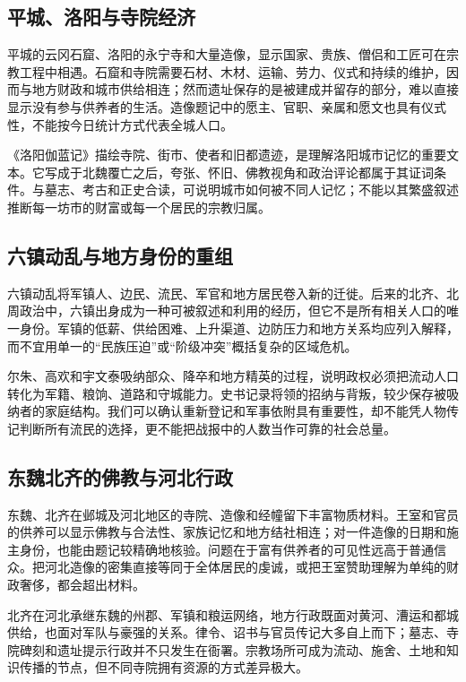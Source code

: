 \subsection{平城、洛阳与寺院经济}

平城的云冈石窟、洛阳的永宁寺和大量造像，显示国家、贵族、僧侣和工匠可在宗教工程中相遇。石窟和寺院需要石材、木材、运输、劳力、仪式和持续的维护，因而与地方财政和城市供给相连；然而遗址保存的是被建成并留存的部分，难以直接显示没有参与供养者的生活。造像题记中的愿主、官职、亲属和愿文也具有仪式性，不能按今日统计方式代表全城人口。

《洛阳伽蓝记》描绘寺院、街市、使者和旧都遗迹，是理解洛阳城市记忆的重要文本。它写成于北魏覆亡之后，夸张、怀旧、佛教视角和政治评论都属于其证词条件。与墓志、考古和正史合读，可说明城市如何被不同人记忆；不能以其繁盛叙述推断每一坊市的财富或每一个居民的宗教归属。

\subsection{六镇动乱与地方身份的重组}

六镇动乱将军镇人、边民、流民、军官和地方居民卷入新的迁徙。后来的北齐、北周政治中，六镇出身成为一种可被叙述和利用的经历，但它不是所有相关人口的唯一身份。军镇的低薪、供给困难、上升渠道、边防压力和地方关系均应列入解释，而不宜用单一的“民族压迫”或“阶级冲突”概括复杂的区域危机。

尔朱、高欢和宇文泰吸纳部众、降卒和地方精英的过程，说明政权必须把流动人口转化为军籍、粮饷、道路和守城能力。史书记录将领的招纳与背叛，较少保存被吸纳者的家庭结构。我们可以确认重新登记和军事依附具有重要性，却不能凭人物传记判断所有流民的选择，更不能把战报中的人数当作可靠的社会总量。

\subsection{东魏北齐的佛教与河北行政}

东魏、北齐在邺城及河北地区的寺院、造像和经幢留下丰富物质材料。王室和官员的供养可以显示佛教与合法性、家族记忆和地方结社相连；对一件造像的日期和施主身份，也能由题记较精确地核验。问题在于富有供养者的可见性远高于普通信众。把河北造像的密集直接等同于全体居民的虔诚，或把王室赞助理解为单纯的财政奢侈，都会超出材料。

北齐在河北承继东魏的州郡、军镇和粮运网络，地方行政既面对黄河、漕运和都城供给，也面对军队与豪强的关系。律令、诏书与官员传记大多自上而下；墓志、寺院碑刻和遗址提示行政并不只发生在衙署。宗教场所可成为流动、施舍、土地和知识传播的节点，但不同寺院拥有资源的方式差异极大。

